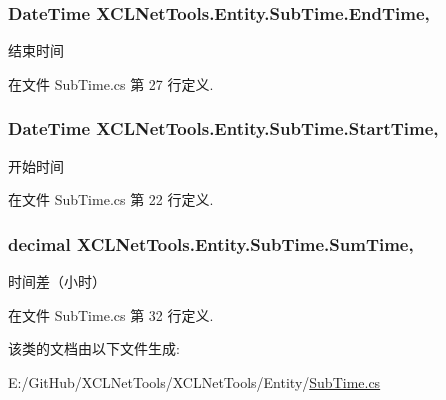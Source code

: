 \subsubsection[{\texorpdfstring{End\+Time}{EndTime}}]{\setlength{\rightskip}{0pt plus 5cm}Date\+Time X\+C\+L\+Net\+Tools.\+Entity.\+Sub\+Time.\+End\+Time\hspace{0.3cm}{\ttfamily [get]}, {\ttfamily [set]}}\hypertarget{class_x_c_l_net_tools_1_1_entity_1_1_sub_time_a286d907d4beb9e6153f1abdb6f2c95fd}{}\label{class_x_c_l_net_tools_1_1_entity_1_1_sub_time_a286d907d4beb9e6153f1abdb6f2c95fd}


结束时间 



在文件 Sub\+Time.\+cs 第 27 行定义.

\subsubsection[{\texorpdfstring{Start\+Time}{StartTime}}]{\setlength{\rightskip}{0pt plus 5cm}Date\+Time X\+C\+L\+Net\+Tools.\+Entity.\+Sub\+Time.\+Start\+Time\hspace{0.3cm}{\ttfamily [get]}, {\ttfamily [set]}}\hypertarget{class_x_c_l_net_tools_1_1_entity_1_1_sub_time_a7813c7a0874535abbe0b5307d7310c27}{}\label{class_x_c_l_net_tools_1_1_entity_1_1_sub_time_a7813c7a0874535abbe0b5307d7310c27}


开始时间 



在文件 Sub\+Time.\+cs 第 22 行定义.

\subsubsection[{\texorpdfstring{Sum\+Time}{SumTime}}]{\setlength{\rightskip}{0pt plus 5cm}decimal X\+C\+L\+Net\+Tools.\+Entity.\+Sub\+Time.\+Sum\+Time\hspace{0.3cm}{\ttfamily [get]}, {\ttfamily [set]}}\hypertarget{class_x_c_l_net_tools_1_1_entity_1_1_sub_time_afe5aa74e0038c4b4342be84211c3f607}{}\label{class_x_c_l_net_tools_1_1_entity_1_1_sub_time_afe5aa74e0038c4b4342be84211c3f607}


时间差（小时） 



在文件 Sub\+Time.\+cs 第 32 行定义.



该类的文档由以下文件生成\+:\begin{DoxyCompactItemize}
\item 
E\+:/\+Git\+Hub/\+X\+C\+L\+Net\+Tools/\+X\+C\+L\+Net\+Tools/\+Entity/\hyperlink{_sub_time_8cs}{Sub\+Time.\+cs}\end{DoxyCompactItemize}
